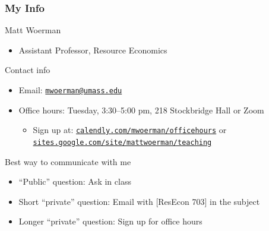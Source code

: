 \documentclass{beamer}
\begin{document}
\begin{frame}\frametitle{My Info}
    Matt Woerman
    \begin{itemize}
        \item Assistant Professor, Resource Economics
    \end{itemize}
    \vspace{2ex}
    Contact info
    \begin{itemize}
        \item Email: \href{mailto:mwoerman@umass.edu}{\texttt{mwoerman@umass.edu}}
        \item Office hours: Tuesday, 3:30--5:00 pm, 218 Stockbridge Hall or Zoom
        \begin{itemize}
        	\item Sign up at: \href{https://calendly.com/mwoerman/officehours}{\texttt{calendly.com/mwoerman/officehours}} or \href{https://sites.google.com/site/mattwoerman/teaching}{\texttt{sites.google.com/site/mattwoerman/teaching}}
        \end{itemize}
    \end{itemize}
    \vspace{2ex}
    Best way to communicate with me
    \begin{itemize}
        \item ``Public'' question: Ask in class
        \item Short ``private'' question: Email with [ResEcon 703] in the subject
        \item Longer ``private'' question: Sign up for office hours
    \end{itemize}
\end{frame}
\end{document}
